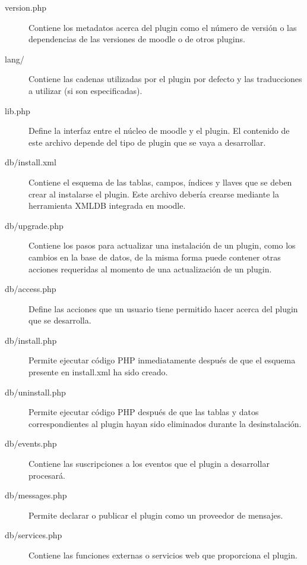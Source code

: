 \begin{description}
    \item[version.php] Contiene los metadatos acerca del plugin como el número de versión o las dependencias de las versiones de moodle o de otros plugins.
    
    \item[lang/] Contiene las cadenas utilizadas por el plugin por defecto y las traducciones a utilizar (si son especificadas).
    
    \item[lib.php] Define la interfaz entre el núcleo de moodle y el plugin. El contenido de este archivo depende del tipo de plugin que se vaya a desarrollar.
    
    \item[db/install.xml] Contiene el esquema de las tablas, campos, índices y llaves que se deben crear al instalarse el plugin. Este archivo debería crearse mediante la herramienta XMLDB integrada en moodle.
    
    \item[db/upgrade.php] Contiene los pasos para actualizar una instalación de un plugin, como los cambios en la base de datos, de la misma forma puede contener otras acciones requeridas al momento de una actualización de un plugin.
    
    \item[db/access.php] Define las acciones que un usuario tiene permitido hacer acerca del plugin que se desarrolla.
    
    \item[db/install.php] Permite ejecutar código PHP inmediatamente después de que el esquema presente en install.xml ha sido creado.
    
    \item[db/uninstall.php] Permite ejecutar código PHP después de que las tablas y datos correspondientes al plugin hayan sido eliminados durante la desinstalación.
    
    \item[db/events.php] Contiene las suscripciones a los eventos que el plugin a desarrollar procesará.
    
    \item[db/messages.php] Permite declarar o publicar el plugin como un proveedor de mensajes.
    
    \item[db/services.php] Contiene las funciones externas o servicios web que proporciona el plugin.
    

\end{description}
